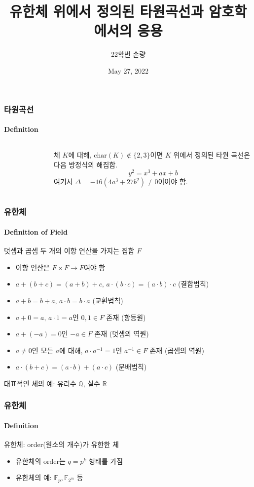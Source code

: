 \documentclass[aspectratio=169,mathserif]{beamer}
\title{유한체 위에서 정의된 타원곡선과 암호학에서의 응용}
\author[Sohn]{22학번 손량}
\date{May 27, 2022}
\newcommand{\Fp}{\mathbb{F}_p}
\newcommand{\Ftwom}{\mathbb{F}_{2^m}}
\begin{document}
  \begin{frame}
    \titlepage
  \end{frame}

  \begin{frame}
    \frametitle{타원곡선}
    \framesubtitle{Definition}

    \begin{columns}
      \begin{figure}
        \centering
        \scalebox{0.5}{}
      \end{figure}
      체 \(K\)에 대해, \(\mathrm{char}(K)\not\in\{2,3\}\)이면 \(K\) 위에서 정의된 타원 곡선은 다음 방정식의 해집합.
      \[y^2 = x^3 + ax + b\]
      여기서 \(\Delta = -16(4a^3 + 27b^2) \not= 0\)이어야 함.
    \end{columns}
  \end{frame}

  \begin{frame}
    \frametitle{유한체}
    \framesubtitle{Definition of Field}
    덧셈과 곱셈 두 개의 이항 연산을 가지는 집합 \(F\)
    \pause
    \begin{itemize}
      \item 이항 연산은 \(F\times F\to F\)여야 함
      \pause
      \item \(a+(b+c)=(a+b)+c,\,a\cdot(b\cdot c)=(a\cdot b)\cdot c\) (결합법칙)
      \item \(a+b=b+a,\,a\cdot b=b\cdot a\) (교환법칙)
      \item \(a+0=a,\,a\cdot 1=a\)인 \(0, 1\in F\) 존재 (항등원)
      \item \(a+(-a)=0\)인 \(-a\in F\) 존재 (덧셈의 역원)
      \item \(a\not=0\)인 모든 \(a\)에 대해, \(a\cdot a^{-1}=1\)인 \(a^{-1}\in F\) 존재 (곱셈의 역원)
      \item \(a\cdot(b+c)=(a\cdot b)+(a\cdot c)\) (분배법칙)
    \end{itemize}
    \pause
    대표적인 체의 예: 유리수 \(\mathbb{Q}\), 실수 \(\mathbb{R}\)
  \end{frame}

  \begin{frame}
    \frametitle{유한체}
    \framesubtitle{Definition}

    유한체: order(원소의 개수)가 유한한 체
    \begin{itemize}
      \item 유한체의 order는 \(q=p^k\) 형태를 가짐
      \item 유한체의 예: \(\Fp, \Ftwom\) 등
    \end{itemize}
  \end{frame}
\end{document}
